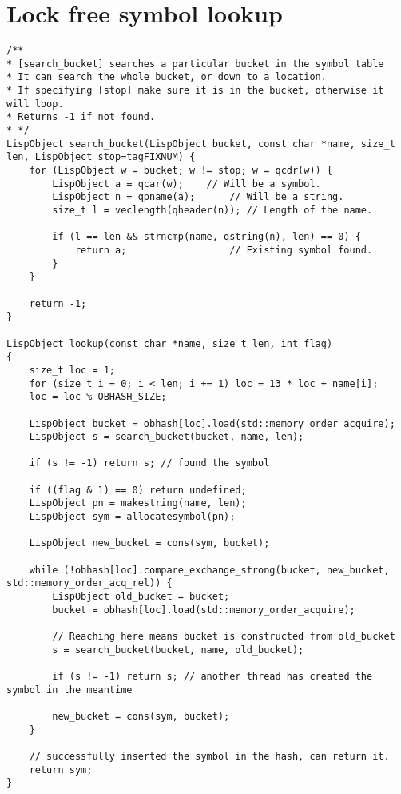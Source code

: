 \section{Lock free symbol lookup}
\label{sec:lockfree-code}

\begin{code}
\begin{verbatim}
/**
* [search_bucket] searches a particular bucket in the symbol table
* It can search the whole bucket, or down to a location.
* If specifying [stop] make sure it is in the bucket, otherwise it will loop.
* Returns -1 if not found.
* */
LispObject search_bucket(LispObject bucket, const char *name, size_t len, LispObject stop=tagFIXNUM) {
    for (LispObject w = bucket; w != stop; w = qcdr(w)) {
        LispObject a = qcar(w);    // Will be a symbol.
        LispObject n = qpname(a);      // Will be a string.
        size_t l = veclength(qheader(n)); // Length of the name.

        if (l == len && strncmp(name, qstring(n), len) == 0) {
            return a;                  // Existing symbol found.
        }
    }

    return -1;
}

LispObject lookup(const char *name, size_t len, int flag)
{
    size_t loc = 1;
    for (size_t i = 0; i < len; i += 1) loc = 13 * loc + name[i];
    loc = loc % OBHASH_SIZE;

    LispObject bucket = obhash[loc].load(std::memory_order_acquire);
    LispObject s = search_bucket(bucket, name, len);

    if (s != -1) return s; // found the symbol

    if ((flag & 1) == 0) return undefined;
    LispObject pn = makestring(name, len);
    LispObject sym = allocatesymbol(pn);

    LispObject new_bucket = cons(sym, bucket);

    while (!obhash[loc].compare_exchange_strong(bucket, new_bucket, std::memory_order_acq_rel)) {
        LispObject old_bucket = bucket;
        bucket = obhash[loc].load(std::memory_order_acquire);

        // Reaching here means bucket is constructed from old_bucket
        s = search_bucket(bucket, name, old_bucket);

        if (s != -1) return s; // another thread has created the symbol in the meantime

        new_bucket = cons(sym, bucket);
    }

    // successfully inserted the symbol in the hash, can return it.
    return sym;
}
\end{verbatim}
\end{code}

